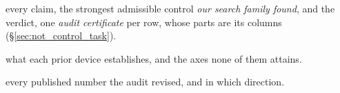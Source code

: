 \begin{description}[nosep, leftmargin=1.2em]
\item[Table~\ref{tab:entitlements}] every claim, the strongest admissible control \emph{our search
  family found}, and the verdict, one \emph{audit certificate} per row, whose parts are its
  columns (\S\ref{sec:not_control_task}).
\item[Table~\ref{tab:novelty}] what each prior device establishes, and the axes none of them attains.
\item[Table~\ref{tab:audit_changes}] every published number the audit revised, and in which direction.

\end{description}

